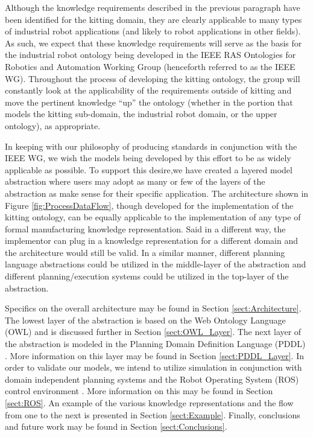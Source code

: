 \documentclass[a4paper, 10pt, conference]{ieeeconf}      %
\begin{document}
Although the knowledge requirements described in the previous paragraph have been identified for the kitting domain, they are clearly applicable to many types of industrial robot applications (and likely to robot applications in other fields). As such, we expect that these knowledge requirements will serve as the basis for the industrial robot ontology being developed in the IEEE  RAS Ontologies for Robotics and Automation Working Group \cite{Madhavan2011} (henceforth referred to as the IEEE WG). Throughout the process of developing the kitting ontology, the group will constantly look at the applicability of the requirements outside of kitting and move the pertinent knowledge ``up'' the ontology (whether in the portion that models the kitting sub-domain, the industrial robot domain, or the upper ontology), as appropriate.

In keeping with our philosophy of producing standards in conjunction with the IEEE WG, we wish the models being developed by this effort to be as widely applicable as possible. To support this desire,we have
created a layered model abstraction where users may adopt as many or few of the layers of the abstraction as make sense for their
specific application.  The architecture shown in Figure \ref{fig:ProcessDataFlow}, though developed for the implementation of the kitting ontology, can be equally applicable to the implementation of any type of formal manufacturing knowledge representation. Said in a different way, the implementor can plug in a knowledge representation for a different domain and the architecture would still be valid. In a similar manner, different planning language abstractions could be utilized in the middle-layer of the
abstraction and different planning/execution systems could be utilized in the top-layer of the abstraction.

Specifics on the overall architecture may be found in Section \ref{sect:Architecture}. The lowest layer of the abstraction
is based on
the Web Ontology Language (OWL) \cite{OWL} and is discussed further in Section \ref{sect:OWL_Layer}. The next layer of the
abstraction is
modeled in the Planning Domain Definition Language (PDDL) \cite{PDDL}. More information on this layer may be found in Section
\ref{sect:PDDL_Layer}. In order to validate our models, we intend to utilize simulation in conjunction with  domain independent planning
systems and the Robot
Operating System (ROS) control environment \cite{ROS}. More information on this may be found in Section \ref{sect:ROS}. An example of the
various knowledge representations and the flow from one to the next is presented in Section \ref{sect:Example}. Finally,
conclusions and future work may be found in Section \ref{sect:Conclusions}.
\end{document}
